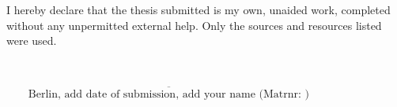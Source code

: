 

I hereby declare that the thesis submitted is my own, unaided work, completed without any unpermitted external help. Only the sources and resources listed were used.

~~~\\

\vspace{5cm}

$\overline{~~~~~~~~~\mbox{Berlin, add date of submission, add your name (Matrnr: )}~~~~~~~~~}$


